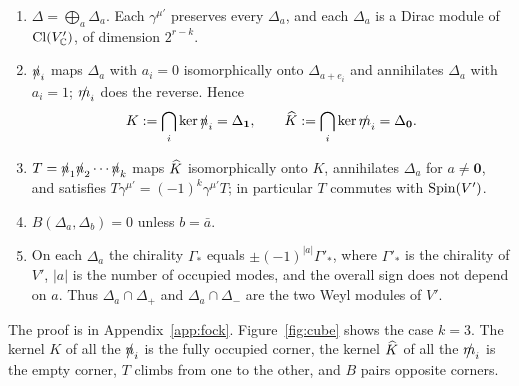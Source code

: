 \begin{lemma}
\label{lem:fock}
\begin{enumerate}[label=(\roman*)]
\item $\Delta=\bigoplus_a\Delta_a$. Each $\gamma^{\mu'}$ preserves every $\Delta_a$, and each $\Delta_a$ is a Dirac module of $\operatorname{Cl}(V'_{\mathbb{C}})$, of dimension $2^{r-k}$.
\item $\slashed{n}_i$ maps $\Delta_a$ with $a_i=0$ isomorphically onto $\Delta_{a+e_i}$ and annihilates $\Delta_a$ with $a_i=1$; $\slashed{m}_i$ does the reverse. Hence
\begin{equation}
K:=\bigcap_i\ker\slashed{n}_i=\Delta_{\mathbf 1},\qquad \widehat{K}:=\bigcap_i\ker\slashed{m}_i=\Delta_{\mathbf 0}.
\end{equation}
\item $T=\slashed{n}_1\slashed{n}_2\cdots\slashed{n}_k$ maps $\widehat{K}$ isomorphically onto $K$, annihilates $\Delta_a$ for $a\ne\mathbf 0$, and satisfies $T\gamma^{\mu'}=(-1)^k\gamma^{\mu'}T$; in particular $T$ commutes with $\operatorname{Spin}(V')$.
\item $B(\Delta_a,\Delta_b)=0$ unless $b=\bar a$.
\item On each $\Delta_a$ the chirality $\Gamma_*$ equals $\pm(-1)^{|a|}\Gamma'_*$, where $\Gamma'_*$ is the chirality of $V'$, $|a|$ is the number of occupied modes, and the overall sign does not depend on $a$. Thus $\Delta_a\cap\Delta_+$ and $\Delta_a\cap\Delta_-$ are the two Weyl modules of $V'$.
\end{enumerate}
\end{lemma}

The proof is in Appendix~\ref{app:fock}. Figure~\ref{fig:cube} shows the case $k=3$. The kernel $K$ of all the $\slashed{n}_i$ is the fully occupied corner, the kernel $\widehat{K}$ of all the $\slashed{m}_i$ is the empty corner, $T$ climbs from one to the other, and $B$ pairs opposite corners.

